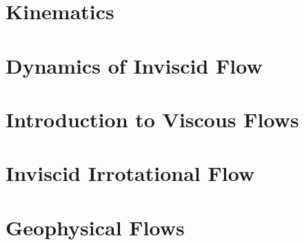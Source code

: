 \documentclass[british,11pt,a4paper]{report}
\begin{document}
\maketitle
\tableofcontents

\chapter{Kinematics}

\chapter{Dynamics of Inviscid Flow}

\chapter{Introduction to Viscous Flows}

\chapter{Inviscid Irrotational Flow}

\chapter{Geophysical Flows}

\end{document}
